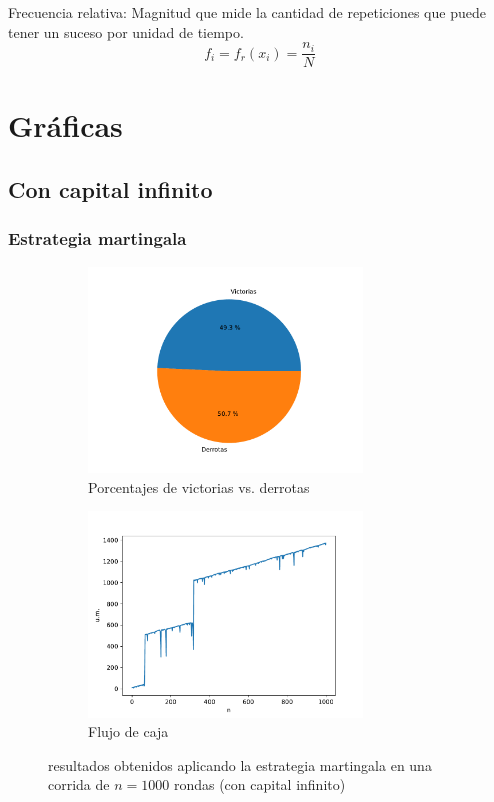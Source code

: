 \documentclass{article}
\begin{document}
    Frecuencia relativa: Magnitud que mide la cantidad de repeticiones que puede tener un suceso por unidad de tiempo.
    \begin{equation}
        f_{i} = f_{r}(x_{i}) = \frac {n_{i}}{N}
    \end{equation}

\section{Gráficas}
  \subsection{Con capital infinito}
  \subsubsection{Estrategia martingala}
  \begin{figure}[H]
    \centering
    \begin{subfigure}{0.5\textwidth}
      \centering
      \includegraphics[width=0.8\textwidth]{generated/porcentajes-martingala-no acotado.pdf}
      \caption{Porcentajes de victorias vs. derrotas}
    \end{subfigure}%
	\begin{subfigure}{0.5\textwidth}
	  \centering
      \includegraphics[width=0.8\textwidth]{generated/capital-martingala-no acotado.pdf}
	  \caption{Flujo de caja}
	\end{subfigure}
	\caption{resultados obtenidos aplicando la estrategia martingala en una corrida de $n = 1000$ rondas (con capital infinito)}
  \end{figure}
\end{document}

